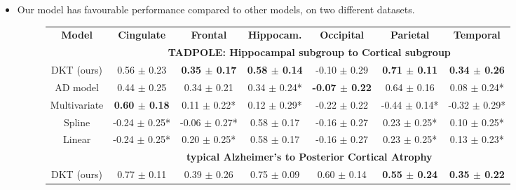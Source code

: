 \documentclass[portrait,a0,final,20pt]{a0poster}
\newcommand{\fnt}[1]{\LARGE{#1}}
\begin{document}
{\begin{multicols}{2}
\vspace{0.6em}

\begin{itemize}

\item \fnt{Our model has favourable performance compared to other models, on two different datasets.}
\vspace{0.3em}
\begin{figure}[H]
\fontsize{27}{30}\selectfont
\begin{tabular}{c | c c c c c c}
\textbf{Model} & \textbf{Cingulate} & \textbf{Frontal} & \textbf{Hippocam.} & \textbf{Occipital} & \textbf{Parietal} & \textbf{Temporal}\\
& \multicolumn{6}{c}{\textbf{TADPOLE: Hippocampal subgroup to Cortical subgroup}}\\
DKT (ours) &      0.56 $\pm$ 0.23 &    \textbf{0.35 $\pm$ 0.17} &        \textbf{0.58 $\pm$ 0.14} &     -0.10 $\pm$ 0.29 &     \textbf{0.71 $\pm$ 0.11} &     \textbf{0.34 $\pm$ 0.26} \\
AD model &      0.44 $\pm$ 0.25 &    0.34 $\pm$ 0.21 &       0.34 $\pm$ 0.24* &     \textbf{-0.07 $\pm$ 0.22} &     0.64 $\pm$ 0.16 &    0.08 $\pm$ 0.24* \\
Multivariate &      \textbf{0.60 $\pm$ 0.18} &   0.11 $\pm$ 0.22* &       0.12 $\pm$ 0.29* &     -0.22 $\pm$ 0.22 &   -0.44 $\pm$ 0.14* &   -0.32 $\pm$ 0.29* \\
Spline &    -0.24 $\pm$ 0.25* &  -0.06 $\pm$ 0.27* &        0.58 $\pm$ 0.17 &     -0.16 $\pm$ 0.27 &    0.23 $\pm$ 0.25* &    0.10 $\pm$ 0.25* \\
Linear &    -0.24 $\pm$ 0.25* &   0.20 $\pm$ 0.25* &        0.58 $\pm$ 0.17 &     -0.16 $\pm$ 0.27 &    0.23 $\pm$ 0.25* &    0.13 $\pm$ 0.23* \\
& \multicolumn{6}{c}{\textbf{typical Alzheimer's to Posterior Cortical Atrophy}}\\
DKT (ours) &    0.77 $\pm$ 0.11 &    0.39 $\pm$ 0.26 &      0.75 $\pm$ 0.09 &    0.60 $\pm$ 0.14 &    \textbf{0.55 $\pm$ 0.24} &    \textbf{0.35 $\pm$ 0.22} \\

\end{tabular}
\end{figure}
\end{itemize}
\end{multicols}}
\end{document}
